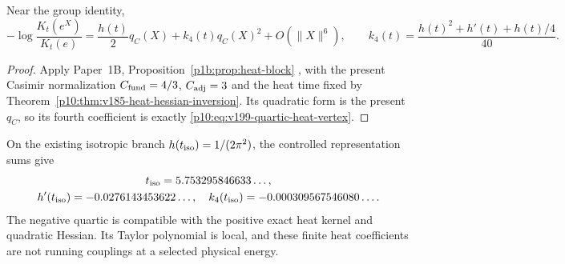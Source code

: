 \documentclass[12pt,a4paper]{article}
\begin{document}
\begin{theorem}
\label{p10:thm:v199-quartic-heat-vertex}
Near the group identity,
\begin{equation}
 -\log\frac{K_t(e^X)}{K_t(e)}
 =\frac{h(t)}2q_C(X)+k_4(t)q_C(X)^2+O(\|X\|^6),\qquad
 k_4(t)=\frac{h(t)^2+h'(t)+h(t)/4}{40}.
 \label{p10:eq:v199-quartic-heat-vertex}
\end{equation}
\end{theorem}
\begin{proof}
Apply Paper~1B, Proposition~\ref{p1b:prop:heat-block}
\cite{Kugelmann2026Paper1B}, with the present Casimir normalization
$C_{\rm fund}=4/3$, $C_{\rm adj}=3$ and the heat time fixed by
Theorem~\ref{p10:thm:v185-heat-hessian-inversion}.
Its quadratic form is the present $q_C$, so its fourth coefficient is
exactly \eqref{p10:eq:v199-quartic-heat-vertex}.
\end{proof}

On the existing isotropic branch \(h(t_{\rm iso})=1/(2\pi^2)\), the
controlled representation sums give
\[
 \begin{gathered}
 t_{\rm iso}=5.753295846633\ldots,\\
 h'(t_{\rm iso})=-0.0276143453622\ldots,\quad
 k_4(t_{\rm iso})=-0.000309567546080\ldots.
 \end{gathered}
\]
The negative quartic is compatible with the positive exact heat kernel and
quadratic Hessian.  Its Taylor polynomial is local, and these finite heat
coefficients are not running couplings at a selected physical energy.
\end{document}

